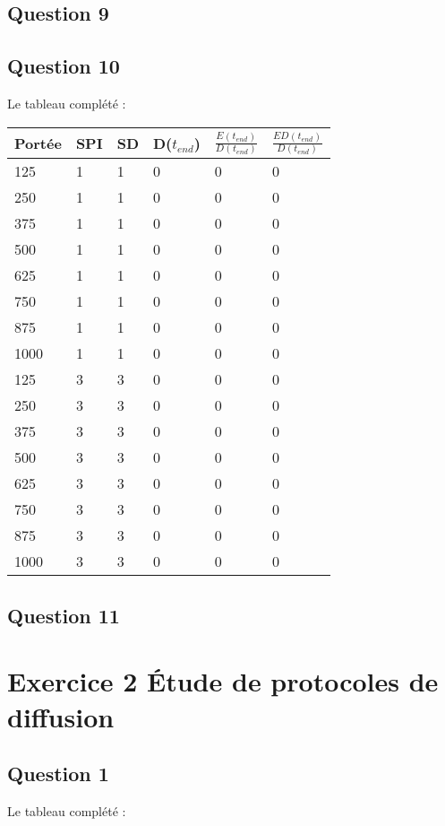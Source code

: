 \documentclass[10pt]{report}
\begin{document}
\subsection{Question 9}
\subsection{Question 10}
Le tableau complété :\\

\begin{center}
\begin{tabular}{|l|l|l|l|l|l|}
  \hline
  Portée & SPI & SD & D($t_{end}$) & $\frac{E(t_{end})}{D(t_{end})}$ & $\frac{ED(t_{end})}{D(t_{end})}$\\
  \hline
	125 & 1 & 1 & 0 & 0 & 0\\
  \hline
	250 & 1 & 1 & 0 & 0 & 0\\
  \hline
	375 & 1 & 1 & 0 & 0 & 0\\
  \hline
	500 & 1 & 1 & 0 & 0 & 0\\
  \hline
	625 & 1 & 1 & 0 & 0 & 0\\
  \hline
	750 & 1 & 1 & 0 & 0 & 0\\
  \hline
	875 & 1 & 1 & 0 & 0 & 0\\
  \hline
	1000 & 1 & 1 & 0 & 0 & 0\\
  \hline
	125 & 3 & 3 & 0 & 0 & 0\\
  \hline
	250 & 3 & 3 & 0 & 0 & 0\\
  \hline
	375 & 3 & 3 & 0 & 0 & 0\\
  \hline
	500 & 3 & 3 & 0 & 0 & 0\\
  \hline
	625 & 3 & 3 & 0 & 0 & 0\\
  \hline
	750 & 3 & 3 & 0 & 0 & 0\\
  \hline
	875 & 3 & 3 & 0 & 0 & 0\\
  \hline
	1000 & 3 & 3 & 0 & 0 & 0\\
  \hline
\end{tabular}
\end{center}


\subsection{Question 11}
\newpage
\section{Exercice 2  Étude de protocoles de diffusion}
\subsection{Question 1}
Le tableau complété :\\
\end{document}
